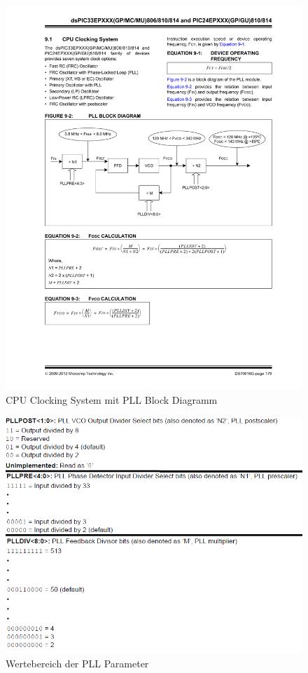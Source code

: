 \begin{figure}
	\centering
	\includegraphics[width=\textwidth]{Images/CPUClockingSystem}
	\caption[CPU Blocking System]{CPU Clocking System mit PLL Block Diagramm}
	\label{image:CPUClockingSystem}
\end{figure}

\begin{figure}
	\centering
	\includegraphics[width=\textwidth]{Images/PLLParameter}
	\caption[Wertebereich der PLL Parameter]{Wertebereich der PLL Parameter}
	\label{image:PLLParameter}
\end{figure}

